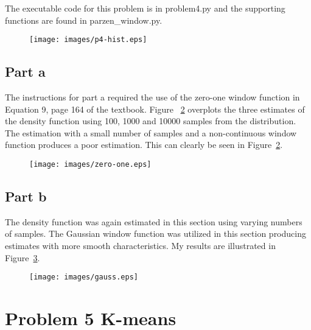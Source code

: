 \documentclass{report}
\begin{document}
The executable code for this problem is in problem4.py and the
supporting functions are found in parzen\_window.py.

\begin{figure}
\centering
  \texttt{[image: images/p4-hist.eps]}
  \label{fig:p4-hist}
\end{figure}

\subsection*{Part a}
The instructions for part a required the use of the zero-one window
function in Equation 9, page 164 of the textbook.  Figure
~\ref{fig:zero-one-parzen} overplots the three estimates of the
density function using 100, 1000 and 10000 samples from the
distribution.  The estimation with a small number of samples
and a non-continuous window function produces a poor estimation.
This can clearly be seen in Figure~\ref{fig:zero-one-parzen}.

\begin{figure}
\centering
  \texttt{[image: images/zero-one.eps]}
  \label{fig:zero-one-parzen}
\end{figure}

\subsection*{Part b}
The density function was again estimated in this section using varying
numbers of samples.  The Gaussian window function was utilized in this
section producing estimates with more smooth characteristics.  My
results are illustrated in Figure~\ref{fig:gauss-parzen}.
\begin{figure}
\centering
  \texttt{[image: images/gauss.eps]}
  \label{fig:gauss-parzen}
\end{figure}

\section*{Problem 5 K-means}
\end{document}
